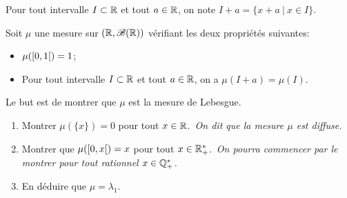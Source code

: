 \begin{td-exo}\label{exo_carac_lebesque}
    Pour tout intervalle \(I\subset\mathbb{R}\) et tout \(a\in\mathbb{R}\), on note \(I+a=\{x+a\ |\ x\in I\}\).
    
    Soit \(\mu\) une mesure sur \((\mathbb{R},\mathscr{B}(\mathbb{R}))\) vérifiant les deux propriétés suivantes:
    \begin{itemize}
        \item \(\mu(\mathopen{}\left[0,1\right[\mathclose{}) =1\);
        \item Pour tout intervalle \(I\subset\mathbb{R}\) et tout \(a\in\mathbb{R}\), on a \(\mu(I+a)=\mu(I)\).
    \end{itemize}
    Le but est de montrer que \(\mu\) est la mesure de Lebesgue.
    \begin{enumerate}
        \item Montrer \(\mu(\{x\})=0\) pour tout \(x\in\mathbb{R}\).\ \textit{On dit que la mesure \(\mu\) est diffuse.}
        \item Montrer que \(\mu(\mathopen{}\left[0,x\right[\mathclose{})=x\) pour tout \(x\in\mathbb{R}_+^*\).\ \textit{On pourra commencer par le montrer pour tout rationnel \(x\in\mathbb{Q}_+^*\).}
        \item En déduire que \(\mu=\lambda_1\).
    \end{enumerate}
\end{td-exo}
